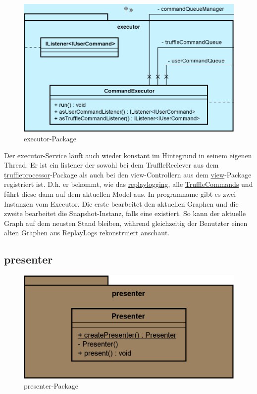     \begin{figure}[H]
      \centering
      \includegraphics[width=\textwidth]{../diagramimages/executor.png}
      \caption{executor-Package}
    \end{figure}
    
    \medskip
    Der executor-Service läuft auch wieder konstant im Hintegrund in seinem
    eigenen Thread. Er ist ein \gls{listener} der sowohl bei dem TruffleReciever aus dem
    \hyperref[subsubsec:truffleprocessor]{truffleprocessor}-Package als
    auch bei den view-Controllern aus dem \hyperref[subsec:view]{view}-Package
    registriert ist. D.h. er bekommt, wie das \hyperref[subsubsec:replaylogging]{replaylogging},
    alle \hyperref[subsubsec:trufflecommand]{TruffleCommands} und führt diese
    dann auf dem aktuellen Model aus.
    \newline
    \newline
    In \gls{programname} gibt es zwei Instanzen vom Executor. Die erste bearbeitet
    den aktuellen Graphen und die zweite bearbeitet die Snapshot-Instanz, falls
    eine existiert. So kann der aktuelle Graph auf dem neusten Stand bleiben, während
    gleichzeitig der Benutzter einen alten Graphen aus
    ReplayLogs rekonstruiert anschaut.


\subsection{presenter}
\label{subsec:presenter}

\begin{figure}[H]
  \centering
  \includegraphics[width=\textwidth]{../diagramimages/presenter.png}
  \caption{presenter-Package}
\end{figure}

